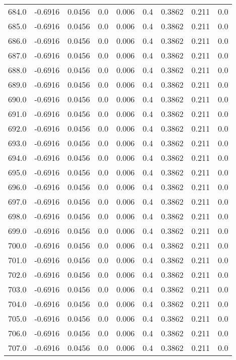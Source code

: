 \begin{longtable}{lrrrrrrrr}
684.0 & -0.6916 & 0.0456 & 0.0 & 0.006 & 0.4 & 0.3862 & 0.211 & 0.0 \\
685.0 & -0.6916 & 0.0456 & 0.0 & 0.006 & 0.4 & 0.3862 & 0.211 & 0.0 \\
686.0 & -0.6916 & 0.0456 & 0.0 & 0.006 & 0.4 & 0.3862 & 0.211 & 0.0 \\
687.0 & -0.6916 & 0.0456 & 0.0 & 0.006 & 0.4 & 0.3862 & 0.211 & 0.0 \\
688.0 & -0.6916 & 0.0456 & 0.0 & 0.006 & 0.4 & 0.3862 & 0.211 & 0.0 \\
689.0 & -0.6916 & 0.0456 & 0.0 & 0.006 & 0.4 & 0.3862 & 0.211 & 0.0 \\
690.0 & -0.6916 & 0.0456 & 0.0 & 0.006 & 0.4 & 0.3862 & 0.211 & 0.0 \\
691.0 & -0.6916 & 0.0456 & 0.0 & 0.006 & 0.4 & 0.3862 & 0.211 & 0.0 \\
692.0 & -0.6916 & 0.0456 & 0.0 & 0.006 & 0.4 & 0.3862 & 0.211 & 0.0 \\
693.0 & -0.6916 & 0.0456 & 0.0 & 0.006 & 0.4 & 0.3862 & 0.211 & 0.0 \\
694.0 & -0.6916 & 0.0456 & 0.0 & 0.006 & 0.4 & 0.3862 & 0.211 & 0.0 \\
695.0 & -0.6916 & 0.0456 & 0.0 & 0.006 & 0.4 & 0.3862 & 0.211 & 0.0 \\
696.0 & -0.6916 & 0.0456 & 0.0 & 0.006 & 0.4 & 0.3862 & 0.211 & 0.0 \\
697.0 & -0.6916 & 0.0456 & 0.0 & 0.006 & 0.4 & 0.3862 & 0.211 & 0.0 \\
698.0 & -0.6916 & 0.0456 & 0.0 & 0.006 & 0.4 & 0.3862 & 0.211 & 0.0 \\
699.0 & -0.6916 & 0.0456 & 0.0 & 0.006 & 0.4 & 0.3862 & 0.211 & 0.0 \\
700.0 & -0.6916 & 0.0456 & 0.0 & 0.006 & 0.4 & 0.3862 & 0.211 & 0.0 \\
701.0 & -0.6916 & 0.0456 & 0.0 & 0.006 & 0.4 & 0.3862 & 0.211 & 0.0 \\
702.0 & -0.6916 & 0.0456 & 0.0 & 0.006 & 0.4 & 0.3862 & 0.211 & 0.0 \\
703.0 & -0.6916 & 0.0456 & 0.0 & 0.006 & 0.4 & 0.3862 & 0.211 & 0.0 \\
704.0 & -0.6916 & 0.0456 & 0.0 & 0.006 & 0.4 & 0.3862 & 0.211 & 0.0 \\
705.0 & -0.6916 & 0.0456 & 0.0 & 0.006 & 0.4 & 0.3862 & 0.211 & 0.0 \\
706.0 & -0.6916 & 0.0456 & 0.0 & 0.006 & 0.4 & 0.3862 & 0.211 & 0.0 \\
707.0 & -0.6916 & 0.0456 & 0.0 & 0.006 & 0.4 & 0.3862 & 0.211 & 0.0 \\

\end{longtable}

